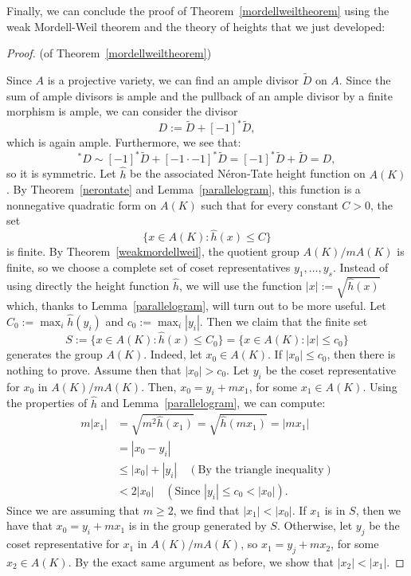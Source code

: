 \documentclass[a4paper, 12pt]{amsart}
\theoremstyle{definition}
\theoremstyle{plain}
\theoremstyle{plain}
\theoremstyle{plain}
\theoremstyle{plain}
\theoremstyle{remark}
\theoremstyle{remark}
\theoremstyle{plain}
\newcommand{\thmref}[1]{Theorem~\ref{#1}}
\newcommand{\lemref}[1]{Lemma~\ref{#1}}
\begin{document}
	Finally, we can conclude the proof of \thmref{mordellweiltheorem} using the weak Mordell-Weil theorem and the theory of heights that we just developed:
	\begin{proof}(of \thmref{mordellweiltheorem})
		
		Since $A$ is a projective variety, we can find an ample divisor $\tilde{D}$ on $A$. Since the sum of ample divisors is ample and the pullback of an ample divisor by a finite morphism is ample, we can consider the divisor
		\begin{equation*}
			D:=\tilde{D}+[-1]^*\tilde{D},
		\end{equation*}
		which is again ample. Furthermore, we see that:
		\begin{equation*}
			[-1]^*D\sim[-1]^*\tilde{D}+[-1\cdot -1]^*\tilde{D}=[-1]^*\tilde{D}+\tilde{D}=D,
		\end{equation*}
		so it is symmetric. Let $\hat{h}$ be the associated Néron-Tate height function on $A(K)$. By \thmref{nerontate} and \lemref{parallelogram}, this function is a nonnegative quadratic form on $A(K)$ such that for every constant $C>0$, the set
		\begin{equation*}
			\{x\in A(K):\hat{h}(x)\le C\}
		\end{equation*}
		is finite. By \thmref{weakmordellweil}, the quotient group $A(K)/mA(K)$ is finite, so we choose a complete set of coset representatives $y_1,\ldots,y_s$. Instead of using directly the height function $\hat{h}$, we will use the function $|x|:=\sqrt{\hat{h}(x)}$ which, thanks to \lemref{parallelogram}, will turn out to be more useful. Let $C_0:=\max_i\hat{h}(y_i)$ and $c_0:=\max_i |y_i|$. Then we claim that the finite set
		\begin{equation*}
			S:=\{x\in A(K):\hat{h}(x)\le C_0\}=\{x\in A(K):|x|\le c_0\}
		\end{equation*}
		generates the group $A(K)$. Indeed, let $x_0\in A(K)$. If $|x_0|\le c_0$, then there is nothing to prove. Assume then that $|x_0|>c_0$. Let $y_i$ be the coset representative for $x_0$ in $A(K)/mA(K)$. Then, $x_0=y_i+mx_1$, for some $x_1\in A(K)$. Using the properties of $\hat{h}$ and \lemref{parallelogram}, we can compute:
		\begin{align*}
			m|x_1|&=\sqrt{m^2\hat{h}(x_1)}=\sqrt{\hat{h}(mx_1)}=|mx_1|\\
			&=|x_0-y_i|\\
			&\le |x_0|+|y_i| \quad(\text{By the triangle inequality})\\
			&< 2|x_0|\quad(\text{Since } |y_i|\le c_0< |x_0|).
		\end{align*}
		Since we are assuming that $m\ge 2$, we find that $|x_1|<|x_0|$. If $x_1$ is in $S$, then we have that $x_0=y_i+mx_1$ is in the group generated by $S$. Otherwise, let $y_j$ be the coset representative for $x_1$ in $A(K)/mA(K)$, so $x_1=y_j+mx_2$, for some $x_2\in A(K)$. By the exact same argument as before, we show that $|x_2|<|x_1|$.
		

\end{proof}
\end{document}
